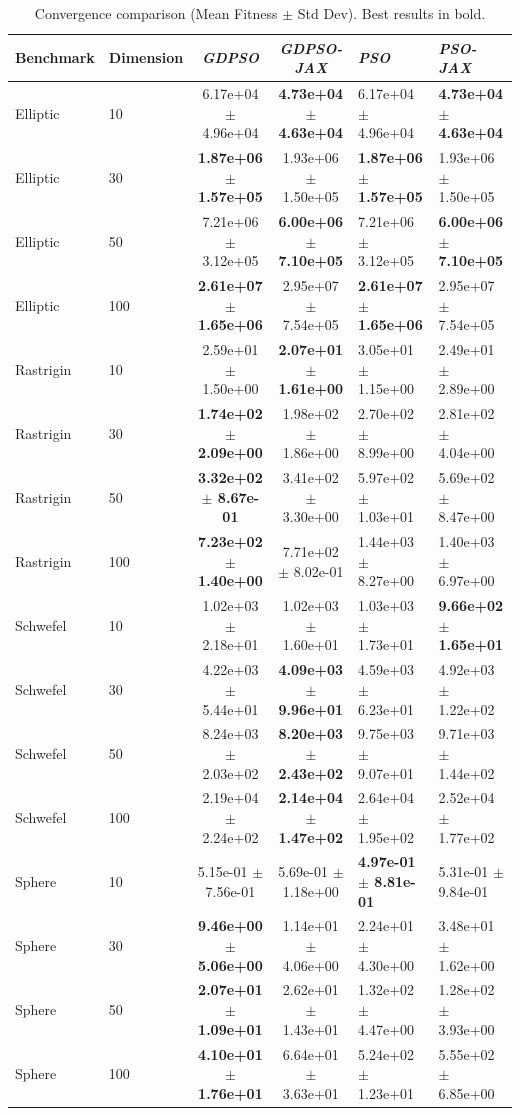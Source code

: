 \begin{table}[h]
\caption{Convergence comparison (Mean Fitness $\pm$ Std Dev). Best results in bold.}
\label{tab:convergence}
\begin{tabular}{llcc}
\toprule
Benchmark & Dimension & \textit{GDPSO} & \textit{GDPSO-JAX} & \textit{PSO} & \textit{PSO-JAX} \\
\midrule
Elliptic & 10 & 6.17e+04 $\pm$ 4.96e+04 & \textbf{4.73e+04 $\pm$ 4.63e+04} & 6.17e+04 $\pm$ 4.96e+04 & \textbf{4.73e+04 $\pm$ 4.63e+04} \\
Elliptic & 30 & \textbf{1.87e+06 $\pm$ 1.57e+05} & 1.93e+06 $\pm$ 1.50e+05 & \textbf{1.87e+06 $\pm$ 1.57e+05} & 1.93e+06 $\pm$ 1.50e+05 \\
Elliptic & 50 & 7.21e+06 $\pm$ 3.12e+05 & \textbf{6.00e+06 $\pm$ 7.10e+05} & 7.21e+06 $\pm$ 3.12e+05 & \textbf{6.00e+06 $\pm$ 7.10e+05} \\
Elliptic & 100 & \textbf{2.61e+07 $\pm$ 1.65e+06} & 2.95e+07 $\pm$ 7.54e+05 & \textbf{2.61e+07 $\pm$ 1.65e+06} & 2.95e+07 $\pm$ 7.54e+05 \\
Rastrigin & 10 & 2.59e+01 $\pm$ 1.50e+00 & \textbf{2.07e+01 $\pm$ 1.61e+00} & 3.05e+01 $\pm$ 1.15e+00 & 2.49e+01 $\pm$ 2.89e+00 \\
Rastrigin & 30 & \textbf{1.74e+02 $\pm$ 2.09e+00} & 1.98e+02 $\pm$ 1.86e+00 & 2.70e+02 $\pm$ 8.99e+00 & 2.81e+02 $\pm$ 4.04e+00 \\
Rastrigin & 50 & \textbf{3.32e+02 $\pm$ 8.67e-01} & 3.41e+02 $\pm$ 3.30e+00 & 5.97e+02 $\pm$ 1.03e+01 & 5.69e+02 $\pm$ 8.47e+00 \\
Rastrigin & 100 & \textbf{7.23e+02 $\pm$ 1.40e+00} & 7.71e+02 $\pm$ 8.02e-01 & 1.44e+03 $\pm$ 8.27e+00 & 1.40e+03 $\pm$ 6.97e+00 \\
Schwefel & 10 & 1.02e+03 $\pm$ 2.18e+01 & 1.02e+03 $\pm$ 1.60e+01 & 1.03e+03 $\pm$ 1.73e+01 & \textbf{9.66e+02 $\pm$ 1.65e+01} \\
Schwefel & 30 & 4.22e+03 $\pm$ 5.44e+01 & \textbf{4.09e+03 $\pm$ 9.96e+01} & 4.59e+03 $\pm$ 6.23e+01 & 4.92e+03 $\pm$ 1.22e+02 \\
Schwefel & 50 & 8.24e+03 $\pm$ 2.03e+02 & \textbf{8.20e+03 $\pm$ 2.43e+02} & 9.75e+03 $\pm$ 9.07e+01 & 9.71e+03 $\pm$ 1.44e+02 \\
Schwefel & 100 & 2.19e+04 $\pm$ 2.24e+02 & \textbf{2.14e+04 $\pm$ 1.47e+02} & 2.64e+04 $\pm$ 1.95e+02 & 2.52e+04 $\pm$ 1.77e+02 \\
Sphere & 10 & 5.15e-01 $\pm$ 7.56e-01 & 5.69e-01 $\pm$ 1.18e+00 & \textbf{4.97e-01 $\pm$ 8.81e-01} & 5.31e-01 $\pm$ 9.84e-01 \\
Sphere & 30 & \textbf{9.46e+00 $\pm$ 5.06e+00} & 1.14e+01 $\pm$ 4.06e+00 & 2.24e+01 $\pm$ 4.30e+00 & 3.48e+01 $\pm$ 1.62e+00 \\
Sphere & 50 & \textbf{2.07e+01 $\pm$ 1.09e+01} & 2.62e+01 $\pm$ 1.43e+01 & 1.32e+02 $\pm$ 4.47e+00 & 1.28e+02 $\pm$ 3.93e+00 \\
Sphere & 100 & \textbf{4.10e+01 $\pm$ 1.76e+01} & 6.64e+01 $\pm$ 3.63e+01 & 5.24e+02 $\pm$ 1.23e+01 & 5.55e+02 $\pm$ 6.85e+00 \\
\bottomrule
\end{tabular}
\end{table}

